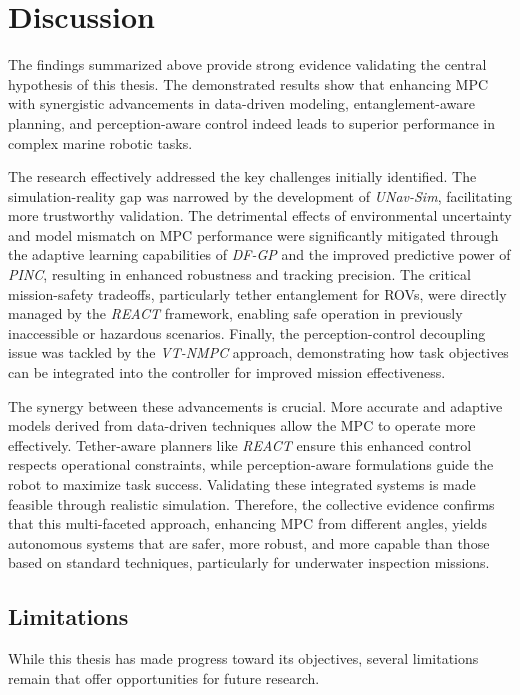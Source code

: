 \section{Discussion}
\label{sec:analysis_results}

The findings summarized above provide strong evidence validating the central hypothesis of this thesis. The demonstrated results show that enhancing \ac{MPC} with synergistic advancements in data-driven modeling, entanglement-aware planning, and perception-aware control indeed leads to superior performance in complex marine robotic tasks.

The research effectively addressed the key challenges initially identified. The simulation-reality gap was narrowed by the development of \textit{UNav-Sim}, facilitating more trustworthy validation. The detrimental effects of environmental uncertainty and model mismatch on \ac{MPC} performance were significantly mitigated through the adaptive learning capabilities of \textit{DF-GP} and the improved predictive power of \textit{PINC}, resulting in enhanced robustness and tracking precision. The critical mission-safety tradeoffs, particularly tether entanglement for \acp{ROV}, were directly managed by the \textit{REACT} framework, enabling safe operation in previously inaccessible or hazardous scenarios. Finally, the perception-control decoupling issue was tackled by the \textit{VT-NMPC} approach, demonstrating how task objectives can be integrated into the controller for improved mission effectiveness.

The synergy between these advancements is crucial. More accurate and adaptive models derived from data-driven techniques allow the \ac{MPC} to operate more effectively. Tether-aware planners like \textit{REACT} ensure this enhanced control respects operational constraints, while perception-aware formulations guide the robot to maximize task success. Validating these integrated systems is made feasible through realistic simulation. Therefore, the collective evidence confirms that this multi-faceted approach, enhancing \ac{MPC} from different angles, yields autonomous systems that are safer, more robust, and more capable than those based on standard techniques, particularly for underwater inspection missions.

\subsection{Limitations}

While this thesis has made progress toward its objectives, several limitations remain that offer opportunities for future research.

